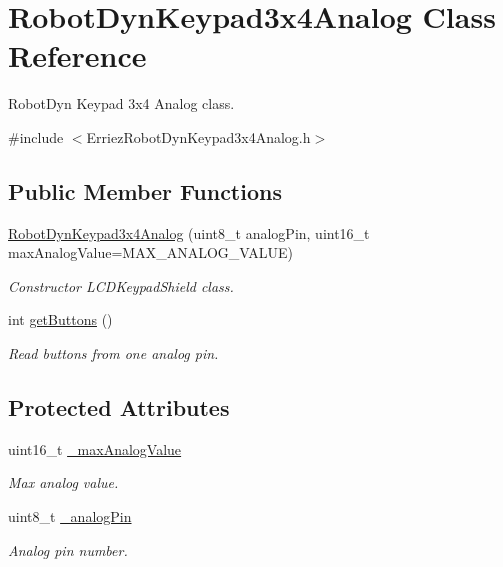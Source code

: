 \hypertarget{class_robot_dyn_keypad3x4_analog}{}\section{Robot\+Dyn\+Keypad3x4\+Analog Class Reference}
\label{class_robot_dyn_keypad3x4_analog}


Robot\+Dyn Keypad 3x4 Analog class.  




{\ttfamily \#include $<$Erriez\+Robot\+Dyn\+Keypad3x4\+Analog.\+h$>$}

\subsection*{Public Member Functions}
\begin{DoxyCompactItemize}
\item 
\hyperlink{class_robot_dyn_keypad3x4_analog_afbbe61d9d440d6f99befeb6cd819e90e}{Robot\+Dyn\+Keypad3x4\+Analog} (uint8\+\_\+t analog\+Pin, uint16\+\_\+t max\+Analog\+Value=M\+A\+X\+\_\+\+A\+N\+A\+L\+O\+G\+\_\+\+V\+A\+L\+UE)
\begin{DoxyCompactList}\small\item\em Constructor L\+C\+D\+Keypad\+Shield class. \end{DoxyCompactList}\item 
int \hyperlink{class_robot_dyn_keypad3x4_analog_a2124fcf7e5e0298b537d2493549a9082}{get\+Buttons} ()
\begin{DoxyCompactList}\small\item\em Read buttons from one analog pin. \end{DoxyCompactList}\end{DoxyCompactItemize}
\subsection*{Protected Attributes}
\begin{DoxyCompactItemize}
\item 
uint16\+\_\+t \hyperlink{class_robot_dyn_keypad3x4_analog_a27cbce4f1859303d0909335e72d43b91}{\+\_\+max\+Analog\+Value}\hypertarget{class_robot_dyn_keypad3x4_analog_a27cbce4f1859303d0909335e72d43b91}{}\label{class_robot_dyn_keypad3x4_analog_a27cbce4f1859303d0909335e72d43b91}

\begin{DoxyCompactList}\small\item\em Max analog value. \end{DoxyCompactList}\item 
uint8\+\_\+t \hyperlink{class_robot_dyn_keypad3x4_analog_a7ab95a55b9b0faaab6c2fab240d8080f}{\+\_\+analog\+Pin}\hypertarget{class_robot_dyn_keypad3x4_analog_a7ab95a55b9b0faaab6c2fab240d8080f}{}\label{class_robot_dyn_keypad3x4_analog_a7ab95a55b9b0faaab6c2fab240d8080f}

\begin{DoxyCompactList}\small\item\em Analog pin number. \end{DoxyCompactList}\end{DoxyCompactItemize}


